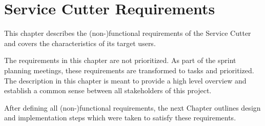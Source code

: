 
\chapter{Service Cutter Requirements}
\label{cha:requirements}

This chapter describes the (non-)functional requirements of the Service Cutter and covers the characteristics of its target users. 

The requirements in this chapter are not prioritized. As part of the sprint planning meetings, these requirements are transformed to tasks and prioritized. The description in this chapter is meant to provide a high level overview and establish a common sense between all stakeholders of this project.







\bigskip

After defining all (non-)functional requirements, the next Chapter outlines design and implementation steps which were taken to satisfy these requirements.

